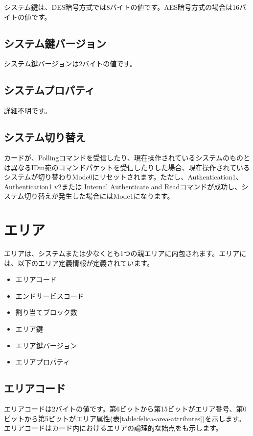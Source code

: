 \documentclass[a4paper]{report}
\begin{document}
システム鍵は、DES暗号方式では8バイトの値です。AES暗号方式の場合は16バイトの値です。

\subsection{システム鍵バージョン}

システム鍵バージョンは2バイトの値です。

\subsection{システムプロパティ}

詳細不明です。

\subsection{システム切り替え}

カードが、Pollingコマンドを受信したり、現在操作されているシステムのものとは異なるIDm宛のコマンドパケットを受信したりした場合、現在操作されているシステムが切り替わりMode0にリセットされます。ただし、Authentication1、Authentication1 v2または Internal Authenticate and Readコマンドが成功し、システム切り替えが発生した場合にはMode1になります。

\section{エリア}

エリアは、システムまたは少なくとも1つの親エリアに内包されます。エリアには、以下のエリア定義情報が定義されています。

\begin{itemize}
    \item エリアコード
    \item エンドサービスコード
    \item 割り当てブロック数
    \item エリア鍵
    \item エリア鍵バージョン
    \item エリアプロパティ
\end{itemize}

\subsection{エリアコード}

エリアコードは2バイトの値です。第6ビットから第15ビットがエリア番号、第0ビットから第5ビットがエリア属性(表\ref{table:felica-area-attributes})を示します。エリアコードはカード内におけるエリアの論理的な始点をも示します。
\end{document}
